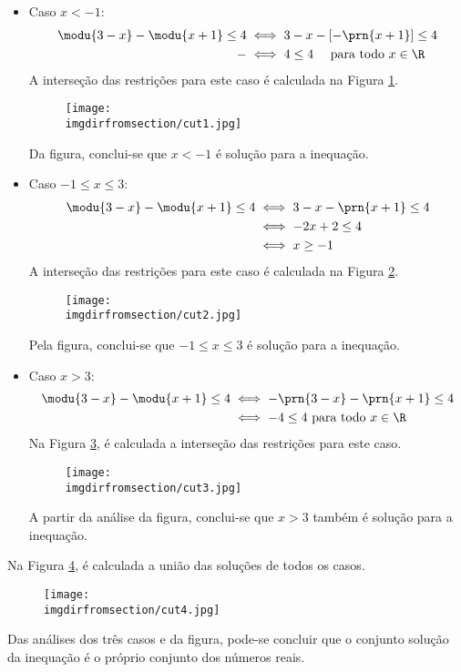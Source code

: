 \begin{solution}
\begin{enumerate}[(a)]
	\begin{itemize}
		\item Caso $x<-1$:
		\begin{align*}
			\modu{3-x}-\modu{x+1}\le4 & \iff 3-x-\left[-\prn{x+1}\right]\le 4\\
				-					  & \iff 4 \le 4 \ \ \ \ \text{para todo } x \in \R
		\end{align*}
		A interseção das restrições para este caso é calculada na Figura \ref{fig:08-28-cut1}.
		\begin{figure}[H]
		\caption{}
		\label{fig:08-28-cut1} %
		\texttt{[image: \\imgdirfromsection/cut1.jpg]}
		\centering
		\end{figure}
		Da figura, conclui-se que $x<-1$ é solução para a inequação.
		\item Caso $-1 \le x \le 3$:
		\begin{align*}
		\modu{3-x} - \modu{x+1} \le 4 & \iff 3-x-\prn{x+1} \le 4 \\
		& \iff -2x+2\le 4\\ 
		& \iff x \ge -1
		\end{align*}
		A interseção das restrições para este caso é calculada na Figura \ref{fig:08-28-cut2}.
		\begin{figure}[H]
		\caption{}
		\label{fig:08-28-cut2} 
		\texttt{[image: \\imgdirfromsection/cut2.jpg]}
		\centering
		\end{figure}
		Pela figura, conclui-se que $-1 \le x \le 3$ é solução para a inequação.
		\item Caso $x > 3$:
		\begin{align*}
		\modu{3-x} - \modu{x+1} \le 4 & \iff -\prn{3-x}-\prn{x+1} \le 4 \\
		& \iff -4\le 4 \text{ para todo }x \in \R
		\end{align*}
		Na Figura \ref{fig:08-28-cut3}, é calculada a interseção das restrições para este caso.
		\begin{figure}[H]
		\caption{}
		\label{fig:08-28-cut3} 
		\texttt{[image: \\imgdirfromsection/cut3.jpg]}
		\centering
		\end{figure}
		A partir da análise da figura, conclui-se que $x>3$ também é solução para a inequação.
	\end{itemize}
\end{enumerate}
%
Na Figura \ref{fig:08-28-cut4}, é calculada a união das soluções de todos os casos.
%
\begin{figure}[H]
\caption{}
\label{fig:08-28-cut4} 
\texttt{[image: \\imgdirfromsection/cut4.jpg]}
\centering
\end{figure}
%
Das análises dos três casos e da figura, pode-se concluir que o conjunto solução da inequação é o próprio conjunto dos números reais.
\end{solution}